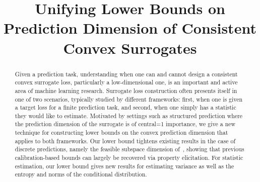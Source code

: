 \documentclass[anon,12pt]{colt2021} %
\title{Unifying Lower Bounds on Prediction Dimension of Consistent Convex Surrogates}
\newcommand{\Comments}{1}
\newcommand{\mytodo}[2]{\ifnum\Comments=1%
	\todo[linecolor=#1!80!black,backgroundcolor=#1,bordercolor=#1!80!black]{#2}\fi}
\newcommand{\jessiet}[1]{\mytodo{purple!20!white}{JF: #1}}
\begin{document}
\maketitle

\begin{abstract}
Given a prediction task, understanding when one can and cannot design a consistent convex surrogate loss, particularly a low-dimensional one, is an important and active area of machine learning research. 
Surrogate loss construction often presents itself in one of two scenarios, typically studied by different frameworks: first, when one is given a target loss for a finite prediction task, and second, when one simply has a statistic they would like to estimate.
Motivated by settings such as structured prediction where the prediction dimension of the surrogate is of central\jessiet{a tad dramatic?} importance, we give a new technique for constructing lower bounds on the convex prediction dimension that applies to both frameworks. 
Our lower bound tightens existing results in the case of discrete predictions, namely the feasible subspace dimension of~\citet{ramaswamy2016convex}, showing that previous calibration-based bounds can largely be recovered via property elicitation.
For statistic estimation, our lower bound gives new results for estimating variance as well as the entropy and norms of the conditional distribution.
%
%
\end{abstract}
\end{document}
